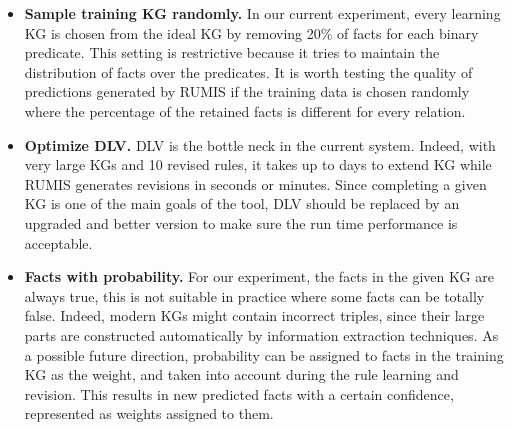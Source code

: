 \begin{itemize}
\item \textbf{Sample training KG randomly.} In our current experiment, every learning KG is chosen from the ideal KG by removing 20\% of facts for each binary predicate. This setting is restrictive because it tries to maintain the distribution of facts over the predicates. It is worth testing the quality of predictions generated by RUMIS if the training data is chosen randomly where the percentage of the retained facts is different for every relation.
\item \textbf{Optimize DLV.} DLV is the bottle neck in the current system. Indeed, with very large KGs and 10 revised rules, it takes up to days to extend KG while RUMIS generates revisions in seconds or minutes. Since completing a given KG is one of the main goals of the tool, DLV should be replaced by an upgraded and better version to make sure the run time performance is acceptable.
\item \textbf{Facts with probability.} For our experiment, the facts in the given KG are always true, this is not suitable in practice where some facts can be totally false. Indeed, modern KGs might contain incorrect triples, since their large parts are constructed automatically by information extraction techniques. As a possible future direction, probability can be assigned to facts in the training KG as the weight, and taken into account during the rule learning and revision. This results in new predicted facts with a certain confidence, represented as weights assigned to them.
\end{itemize}